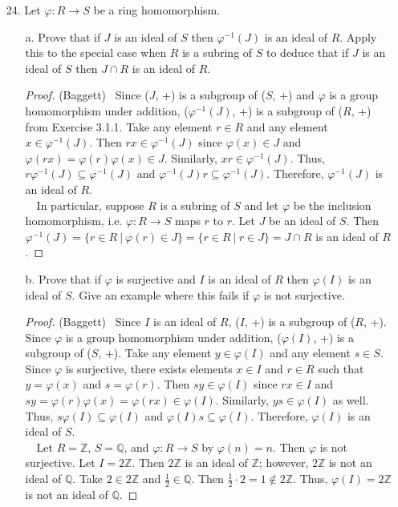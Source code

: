 \documentclass[10pt]{article}
\newcommand{\Z}{\mathbb{Z}}
\begin{document}
\begin{itemize}
\item[24.] Let $\varphi: R \rightarrow S$ be a ring homomorphism.
\begin{itemize}
\item[a.] Prove that if $J$ is an ideal of $S$ then $\varphi^{-1}(J)$ is an ideal of $R$. Apply this to the special
case when $R$ is a subring of $S$ to deduce that if $J$ is an ideal of $S$ then $J \cap R$ is an ideal of $R$.
\begin{proof} (Baggett) \ Since ($J$, +) is a subgroup of ($S$, +) and $\varphi$ is a group homomorphism under addition,
 ($\varphi^{-1}(J)$, +) is a subgroup of ($R$, +) from Exercise 3.1.1. Take any element $r \in R$ and any element
 $x \in \varphi^{-1}(J)$. Then $rx \in \varphi^{-1}(J)$ since $\varphi(x) \in J$ and 
 $\varphi(rx) = \varphi(r)\varphi(x) \in J$. Similarly, $xr \in \varphi^{-1}(J)$. Thus, 
 $r\varphi^{-1}(J) \subseteq \varphi^{-1}(J)$ and $\varphi^{-1}(J)r \subseteq \varphi^{-1}(J)$. Therefore,
 $\varphi^{-1}(J)$ is an ideal of $R$.\\ 
 \ \ In particular, suppose $R$ is a subring of $S$ and let $\varphi$ be the inclusion homomorphism, i.e. 
 $\varphi: R \rightarrow S$ maps $r$ to $r$. Let $J$ be an ideal of $S$. Then 
 $\varphi^{-1}(J) = \{r \in R \ | \ \varphi(r) \in J \} = \{r \in R \ | \ r \in J \} = J \cap R$ is an
 ideal of $R$.
\end{proof}


\item[b.] Prove that if $\varphi$ is surjective and $I$ is an ideal of $R$ then $\varphi(I)$ is an ideal of $S$.
Give an example where this fails if $\varphi$ is not surjective.
\begin{proof} (Baggett) \ Since $I$ is an ideal of $R$, ($I$, +) is a subgroup of ($R$, +). Since $\varphi$ is a
group homomorphism under addition, ($\varphi(I)$, +) is a subgroup of ($S$, +). Take any element $y \in \varphi(I)$
and any element $s \in S$. Since $\varphi$ is surjective, there exists elements $x \in I$ and $r \in R$ such that
$y = \varphi(x)$ and $s = \varphi(r)$. Then $sy \in \varphi(I)$ since 
$rx \in I$ and $sy = \varphi(r)\varphi(x) = \varphi(rx) \in \varphi(I)$. Similarly, $ys \in \varphi(I)$ as well. Thus,
$s\varphi(I) \subseteq \varphi(I)$ and $\varphi(I)s \subseteq \varphi(I)$. Therefore, $\varphi(I)$ is an ideal of $S$.\\ 
\ \ Let $R = \Z$, $S = \mathbb{Q}$, and $\varphi:R \rightarrow S$ by $\varphi(n) = n$. Then $\varphi$ is not surjective. Let
$I = 2\Z$. Then $2\Z$ is an ideal of $\Z$; however, $2\Z$ is not an ideal of $\mathbb{Q}$. Take $2 \in 2\Z$ and $\frac{1}{2} 
\in \mathbb{Q}$. Then $\frac{1}{2} \cdot 2 = 1 \notin 2\Z$. Thus, $\varphi(I) = 2\Z$ is not an ideal of $\mathbb{Q}$.
\end{proof}
\end{itemize}

\end{itemize}
\end{document}
